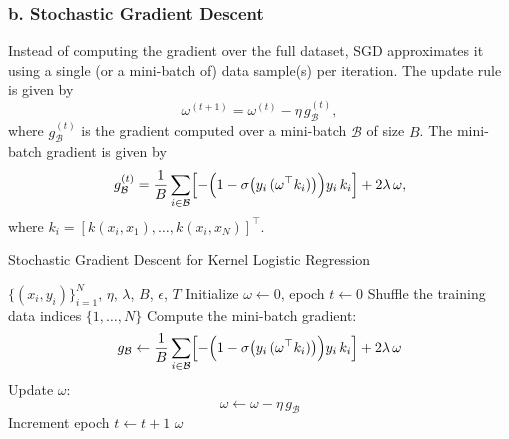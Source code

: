 \documentclass{article}
\begin{document}
\subsubsection{b. Stochastic Gradient Descent}

Instead of computing the gradient over the full dataset, SGD approximates it using a single (or a mini-batch of) data sample(s) per iteration. The update rule is given by
\[
\omega^{(t+1)} = \omega^{(t)} - \eta\, g_{\mathcal{B}}^{(t)},\]
where \(g_{\mathcal{B}}^{(t)}\) is the gradient computed over a mini-batch \(\mathcal{B}\) of size \(B\). The mini-batch gradient is given by
\[
g_{\mathcal{B}}^{(t)} = \frac{1}{B} \sum_{i \in \mathcal{B}} \Bigl[-\Bigl(1-\sigma\bigl(y_i\,(\omega^\top k_i)\bigr)\Bigr)y_i\,k_i\Bigr] + 2\lambda\,\omega,\]
where \(k_i = [k(x_i,x_1), \dots, k(x_i,x_N)]^\top\).

\begin{algorithm}[H]
  \caption{Stochastic Gradient Descent for Kernel Logistic Regression}
  \begin{algorithmic}[1]
  \Require $\{(x_i,y_i)\}_{i=1}^N$, $\eta$, $\lambda$, $B$, $\epsilon$, $T$
  \State Initialize $\omega \gets 0$, epoch $t \gets 0$
  \Repeat
      \State Shuffle the training data indices $\{1, \dots, N\}$
          \State Compute the mini-batch gradient:
          \[
            g_{\mathcal{B}} \gets \frac{1}{B} \sum_{i \in \mathcal{B}} \Bigl[-\Bigl(1-\sigma\bigl(y_i\,(\omega^\top k_i)\bigr)\Bigr)y_i\,k_i\Bigr] + 2\lambda\,\omega
          \]
          \State Update $\omega$:
          \[
            \omega \gets \omega - \eta\, g_{\mathcal{B}}
          \]
      \EndFor
      \State Increment epoch $t \gets t+1$
  \Statex
  \State \Return $\omega$
  \end{algorithmic}
\end{algorithm}
\end{document}
